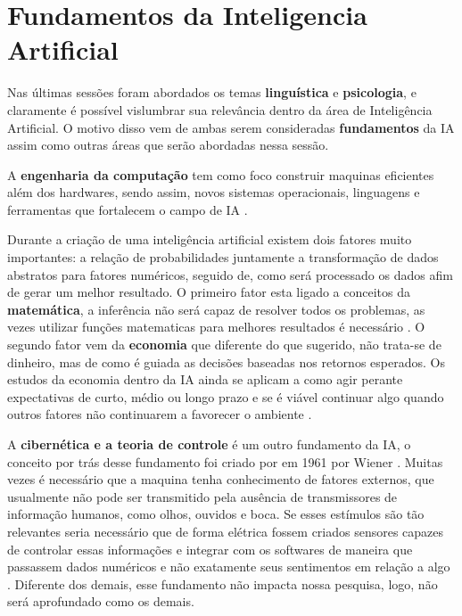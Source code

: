 \section{Fundamentos da Inteligencia Artificial}
Nas últimas sessões foram abordados os temas \textbf{linguística} e \textbf{psicologia}, e claramente é possível vislumbrar sua relevância dentro da área de Inteligência Artificial. O motivo disso vem de ambas serem consideradas \textbf{fundamentos} da IA assim como outras áreas que serão abordadas nessa sessão.

A \textbf{engenharia da computação} tem como foco construir maquinas eficientes além dos hardwares, sendo assim, novos sistemas operacionais, linguagens e ferramentas que fortalecem o campo de IA \cite[13-14]{russell2003artificial}.

Durante a criação de uma inteligência artificial existem dois fatores muito importantes: a relação de probabilidades juntamente a transformação de dados abstratos para fatores numéricos, seguido de, como será processado os dados afim de gerar um melhor resultado. O primeiro fator esta ligado a conceitos da \textbf{matemática}, a inferência não será capaz de resolver todos os problemas, as vezes utilizar funções matematicas para melhores resultados é necessário \cite{boole1854investigation}. O segundo fator vem da \textbf{economia} que diferente do que sugerido, não trata-se de dinheiro, mas de como é guiada as decisões baseadas nos retornos esperados. Os estudos da economia dentro da IA ainda se aplicam a como agir perante expectativas de curto, médio ou longo prazo e se é viável continuar algo quando outros fatores não continuarem a favorecer o ambiente \cite[9]{russell2003artificial}.

A \textbf{cibernética e a teoria de controle} é um outro fundamento da IA, o conceito por trás desse fundamento foi criado por em 1961 por Wiener \cite[15]{russell2003artificial}. Muitas vezes é necessário que a maquina tenha conhecimento de fatores externos, que usualmente não pode ser transmitido pela ausência de transmissores de informação humanos, como olhos, ouvidos e boca. Se esses estímulos são tão relevantes seria necessário que de forma elétrica fossem criados sensores capazes de controlar essas informações e integrar com os softwares de maneira que passassem dados numéricos e não exatamente seus sentimentos em relação a algo \cite[3-7]{wiener1961cybernetics}. Diferente dos demais, esse fundamento não impacta nossa pesquisa, logo, não será aprofundado como os demais.


